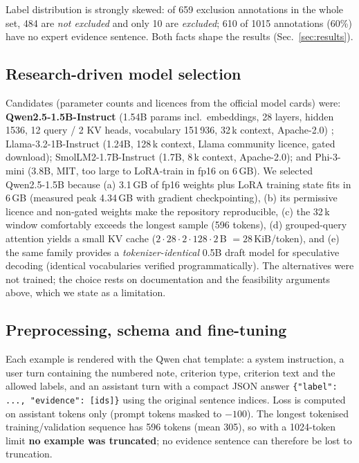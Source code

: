\documentclass[conference]{IEEEtran}
\begin{document}
Label distribution is strongly skewed: of 659 exclusion annotations in the whole set, 484 are \emph{not excluded} and only 10 are \emph{excluded}; 610 of 1015 annotations (60\%) have no expert evidence sentence. Both facts shape the results (Sec.~\ref{sec:results}).

\subsection{Research-driven model selection}
Candidates (parameter counts and licences from the official model cards) were: \textbf{Qwen2.5-1.5B-Instruct} (1.54B params incl.\ embeddings, 28 layers, hidden 1536, 12 query / 2 KV heads, vocabulary 151\,936, 32\,k context, Apache-2.0) \cite{qwen25}; Llama-3.2-1B-Instruct (1.24B, 128\,k context, Llama community licence, gated download); SmolLM2-1.7B-Instruct (1.7B, 8\,k context, Apache-2.0); and Phi-3-mini (3.8B, MIT, too large to LoRA-train in fp16 on 6\,GB). We selected Qwen2.5-1.5B because (a) 3.1\,GB of fp16 weights plus LoRA training state fits in 6\,GB (measured peak 4.34\,GB with gradient checkpointing), (b) its permissive licence and non-gated weights make the repository reproducible, (c) the 32\,k window comfortably exceeds the longest sample (596 tokens), (d) grouped-query attention yields a small KV cache ($2\cdot28\cdot2\cdot128\cdot2$\,B $=28$\,KiB/token), and (e) the same family provides a \emph{tokenizer-identical} 0.5B draft model for speculative decoding (identical vocabularies verified programmatically). The alternatives were not trained; the choice rests on documentation and the feasibility arguments above, which we state as a limitation.

\subsection{Preprocessing, schema and fine-tuning}
Each example is rendered with the Qwen chat template: a system instruction, a user turn containing the numbered note, criterion type, criterion text and the allowed labels, and an assistant turn with a compact JSON answer
\texttt{\{"label": ..., "evidence": [ids]\}} using the original sentence indices. Loss is computed on assistant tokens only (prompt tokens masked to $-100$). The longest tokenised training/validation sequence has 596 tokens (mean 305), so with a 1024-token limit \textbf{no example was truncated}; no evidence sentence can therefore be lost to truncation.
\end{document}
